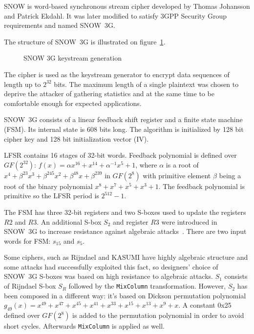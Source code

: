 SNOW is word-based synchronous stream cipher developed by Thomas Johansson
and Patrick Ekdahl. It was later modified to satisfy 3GPP Security Group
requirements and named SNOW~3G.

The structure of SNOW~3G is illustrated on figure~\ref{fig:snow3g_keystream}.
\begin{figure}[htbp]
    \centering
    
    \caption{SNOW 3G keystream generation}
    \label{fig:snow3g_keystream}
\end{figure}

The cipher is used as the keystream generator to encrypt data sequences of
length up to $2^{32}$ bits. The maximum length of a single plaintext was chosen to 
deprive the attacker of gathering statistics and at the same time to be comfortable enough for
expected applications. 

SNOW~3G consists of a linear feedback shift register and a finite state machine
(FSM). Its internal state is 608 bits long. The algorithm is initialized by 128
bit cipher key and 128 bit initialization vector (IV). 

LFSR contains 16 stages of 32-bit words. Feedback polynomial is defined over
$GF(2^{32})$: $f(x) = \alpha x^{16} + x^{14} + \alpha^{-1} x^5 + 1$, where
$\alpha$ is a root of 
\mbox{$x^4 + \beta^{23} x^3 + \beta^{245} x^2 + \beta^{48} x + \beta^{239}$} in 
$GF(2^8)$ with primitive element $\beta$ being a root of the binary polynomial
$x^8 + x^7 + x^5 + x^3 + 1$. The feedback polynomial is primitive so the LFSR
period is $2^{512} - 1$.

The FSM has three 32-bit registers and two S-boxes used to update the registers
$R2$ and $R3$. An additional S-box $S_2$ and register $R3$ were introduced in
SNOW~3G to increase resistance against algebraic attacks~\cite{3gpp:uea2_doc5}.
There are two input words for FSM: $s_{15}$ and $s_5$.

Some ciphers, such as Rijndael and KASUMI have highly algebraic structure and
some attacks had successfully exploited this fact, so designers' choice of
SNOW~3G S-boxes was based on high resistance to algebraic attacks.  $S_1$
consists of Rijndael S-box $S_R$ followed by the \verb+MixColumn+
transformation. However, $S_2$ has been composed in a different way: it's based
on Dickson permutation polynomial 
$g_{49}(x) = 
x^{49} + x^{47} + x^{45} + x^{41} + x^{33} + x^{15} + x^{13} + x^{9} + x$. 
A constant 0x25 defined over $GF(2^8)$ is added to the permutation polynomial in order to
avoid short cycles. Afterwards \verb+MixColumn+ is applied as well.

